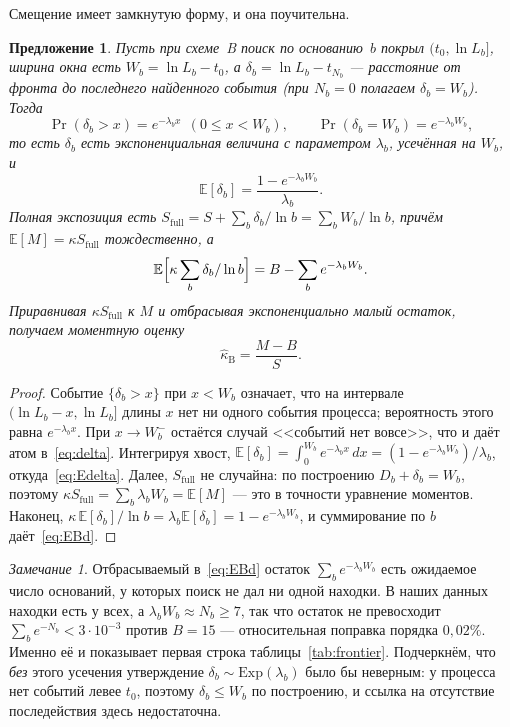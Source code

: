 \documentclass[11pt,a4paper]{article}
\theoremstyle{plain}
\newtheorem{proposition}{Предложение}
\theoremstyle{remark}
\newtheorem{remark}{Замечание}
\begin{document}
Смещение имеет замкнутую форму, и она поучительна.

\begin{proposition}\label{prop:schemeB}
Пусть при схеме~B поиск по основанию~$b$ покрыл $(t_0,\ln L_b]$, ширина окна есть
$W_b=\ln L_b-t_0$, а $\delta_b=\ln L_b-t_{N_b}$ --- расстояние от фронта до последнего
найденного события (при $N_b=0$ полагаем $\delta_b=W_b$). Тогда
\begin{equation}\label{eq:delta}
\Pr(\delta_b>x)=e^{-\lambda_b x}\ \ (0\le x<W_b),\qquad
\Pr(\delta_b=W_b)=e^{-\lambda_b W_b},
\end{equation}
то есть $\delta_b$ есть экспоненциальная величина с параметром $\lambda_b$,
усечённая на $W_b$, и
\begin{equation}\label{eq:Edelta}
\mathbb E[\delta_b]=\frac{1-e^{-\lambda_b W_b}}{\lambda_b}.
\end{equation}
Полная экспозиция есть $S_{\mathrm{full}}=S+\sum_b\delta_b/\ln b=\sum_b W_b/\ln b$,
причём $\mathbb E[M]=\kappa S_{\mathrm{full}}$ тождественно, а
\begin{equation}\label{eq:EBd}
\mathbb E\Bigl[\kappa\sum_b\delta_b/\ln b\Bigr]=B-\sum_b e^{-\lambda_b W_b}.
\end{equation}
Приравнивая $\kappa S_{\mathrm{full}}$ к $M$ и отбрасывая экспоненциально малый
остаток, получаем моментную оценку
\begin{equation}\label{eq:MBS}
\hat\kappa_{\mathrm B}=\frac{M-B}{S}.
\end{equation}
\end{proposition}

\begin{proof}
Событие $\{\delta_b>x\}$ при $x<W_b$ означает, что на интервале
$(\ln L_b-x,\ln L_b]$ длины $x$ нет ни одного события процесса; вероятность этого
равна $e^{-\lambda_b x}$. При $x\to W_b^-$ остаётся случай <<событий нет вовсе>>,
что и даёт атом в~\eqref{eq:delta}. Интегрируя хвост,
$\mathbb E[\delta_b]=\int_0^{W_b}e^{-\lambda_b x}\,dx=(1-e^{-\lambda_b W_b})/\lambda_b$,
откуда~\eqref{eq:Edelta}. Далее, $S_{\mathrm{full}}$ не случайна: по построению
$D_b+\delta_b=W_b$, поэтому $\kappa S_{\mathrm{full}}=\sum_b\lambda_b W_b=\mathbb E[M]$
--- это в точности уравнение моментов. Наконец,
$\kappa\,\mathbb E[\delta_b]/\ln b=\lambda_b\mathbb E[\delta_b]=1-e^{-\lambda_b W_b}$,
и суммирование по $b$ даёт~\eqref{eq:EBd}.
\end{proof}

\begin{remark}\label{rem:atom}
Отбрасываемый в~\eqref{eq:EBd} остаток $\sum_b e^{-\lambda_b W_b}$ есть ожидаемое
число оснований, у которых поиск не дал ни одной находки. В наших данных находки есть
у всех, а $\lambda_b W_b\approx N_b\ge7$, так что остаток не превосходит
$\sum_b e^{-N_b}<3\cdot10^{-3}$ против $B=15$ --- относительная поправка порядка
$0{,}02\%$. Именно её и показывает первая строка таблицы~\ref{tab:frontier}.
Подчеркнём, что \emph{без} этого усечения утверждение $\delta_b\sim\mathrm{Exp}
(\lambda_b)$ было бы неверным: у процесса нет событий левее $t_0$, поэтому
$\delta_b\le W_b$ по построению, и ссылка на отсутствие последействия здесь
недостаточна.
\end{remark}
\end{document}
